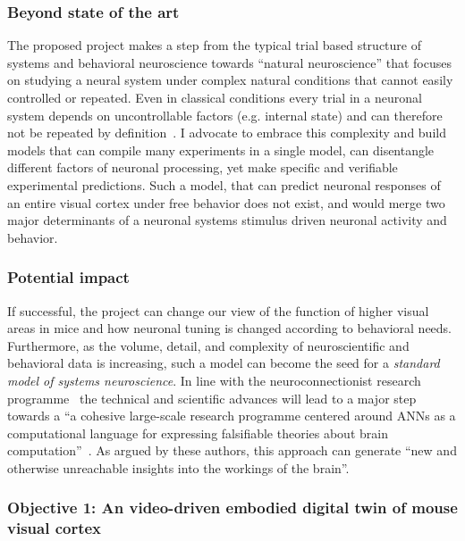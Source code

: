 \documentclass[COG,11pt]{ercgrant}
\begin{document}
\subsubsection{Beyond state of the art}
The proposed project makes a step from the typical trial based structure of systems and behavioral neuroscience towards ``natural neuroscience'' that focuses on studying a neural system under complex natural conditions that cannot easily controlled or repeated. Even in classical conditions every trial in a neuronal system depends on uncontrollable factors (e.g. internal state) and can therefore not be repeated by definition~\parencite{Urai2022-fz}. I advocate to embrace this complexity and build models that can compile many experiments in a single model, can disentangle different factors of neuronal processing, yet make specific and verifiable experimental predictions. 
Such a model, that can predict neuronal responses of an entire visual cortex under free behavior does not exist, and would merge two major determinants of a neuronal systems stimulus driven neuronal activity and behavior. 

\subsubsection{Potential impact}
If successful, the project can change our view of the function of higher visual areas in mice and how neuronal tuning is changed according to behavioral needs. 
Furthermore, as the volume, detail, and complexity of neuroscientific and behavioral data is increasing, such a model can become the seed for a \textit{standard model of systems neuroscience}.
In line with the neuroconnectionist research programme~ the technical and scientific advances will lead to a major step towards a ``a cohesive large-scale research programme centered around ANNs as a computational language for expressing falsifiable theories about brain computation''~\parencite{Doerig2022-ex}. As argued by these authors, this approach can generate ``new and otherwise unreachable insights into the workings of the brain''.


\subsubsection{Objective 1: An video-driven embodied digital twin of mouse visual cortex \hfill{}}
\end{document}
